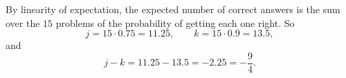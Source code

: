 By linearity of expectation, the expected number of correct answers is the sum over the $15$ problems of the probability of getting each one right. So
\[j=15\cdot0.75=11.25,\qquad k=15\cdot0.9=13.5,\]
and
\[j-k=11.25-13.5=\boxed{-2.25}=-\dfrac94.\]
